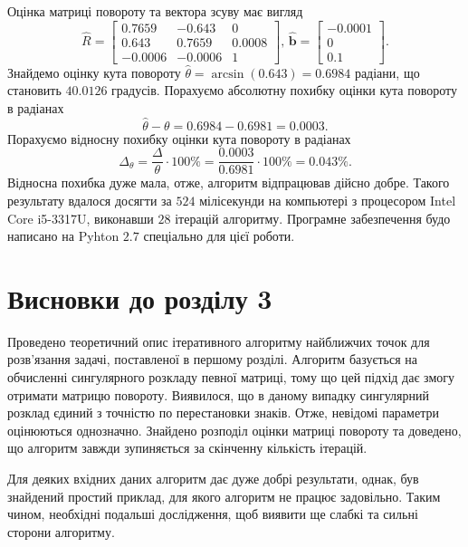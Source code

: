 Оцінка матриці повороту та вектора зсуву має вигляд
\begin{equation*}
  \hat{R} =
  \begin{bmatrix}
    0.7659  & -0.643  & 0 \\
    0.643   & 0.7659  & 0.0008 \\
    -0.0006 & -0.0006 & 1
  \end{bmatrix}, \,
  \hat{\boldsymbol{b}} =
  \begin{bmatrix}
    -0.0001 \\
    0 \\
    0.1
  \end{bmatrix}.
\end{equation*}
Знайдемо оцінку кута повороту
$\hat{\theta} = \arcsin \left( 0.643 \right) = 0.6984$ радіани,
що становить $40.0126$ градусів.
Порахуємо абсолютну похибку оцінки кута повороту в радіанах
\begin{equation*}
  \hat{\theta} - \theta =
  0.6984 - 0.6981 =
  0.0003.
\end{equation*}
Порахуємо відносну похибку оцінки кута повороту в радіанах
\begin{equation*}
  \Delta_{\theta} =
  \frac{\Delta}{\theta} \cdot 100 \%=
  \frac{0.0003}{0.6981} \cdot 100 \% =
  0.043 \%.
\end{equation*}
Відносна похибка дуже мала, отже, алгоритм відпрацював дійсно добре.
Такого результату вдалося досягти за $524$ мілісекунди на компьютері з
процесором Intel Core i5-3317U, виконавши $28$ ітерацій алгоритму.
Програмне забезпечення будо написано на Pyhton $2.7$ спеціально для цієї роботи.

\section*{Висновки до розділу 3}

Проведено теоретичний опис ітеративного алгоритму найближчих точок для
розв'язання задачі, поставленої в першому розділі.
Алгоритм базується на обчисленні сингулярного розкладу певної матриці,
тому що цей підхід дає змогу отримати матрицю повороту.
Виявилося, що в даному випадку сингулярний розклад єдиний з точністю по
перестановки знаків.
Отже, невідомі параметри оцінюються однозначно.
Знайдено розподіл оцінки матриці повороту та доведено,
що алгоритм завжди зупиняється за скінченну кількість ітерацій.

Для деяких вхідних даних алгоритм дає дуже добрі результати, однак,
був знайдений простий приклад, для якого алгоритм не працює задовільно.
Таким чином, необхідні подальші дослідження,
щоб виявити ще слабкі та сильні сторони алгоритму.
